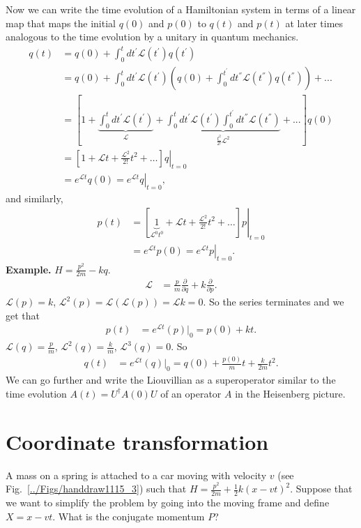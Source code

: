 Now we can write the time evolution of a Hamiltonian system in terms
of a linear map that maps the initial $q(0)$ and $p(0)$ to $q(t)$
and $p(t)$ at later times analogous to the time evolution by a unitary
in quantum mechanics.
\begin{align}
q(t) & =q(0)+\int_{0}^{t}dt^{'}\mathcal{L}\left(t^{'}\right)q\left(t^{'}\right)\\
 & =q(0)+\int_{0}^{t}dt^{'}\mathcal{L}\left(t^{'}\right)\left(q(0)+\int_{0}^{t^{'}}dt^{''}\mathcal{L}\left(t^{''}\right)q\left(t^{''}\right)\right)+...\\
 & =\left[1+\underbrace{\int_{0}^{t}dt^{'}\mathcal{L}\left(t^{'}\right)}_{\mathcal{L}}+\underbrace{\int_{0}^{t}dt^{'}\mathcal{L}\left(t^{'}\right)\int_{0}^{t^{'}}dt^{''}\mathcal{L}\left(t^{''}\right)}_{\frac{t^{2}}{2!}\mathcal{L}^{2}}+...\right]q(0)\\
 &= \left. \left[ 1+ \mathcal{L} t + \frac{\mathcal{L}^2}{2!} t^2 + \ldots \right]q\right|_{t=0}\\
 & =e^{\mathcal{L}t}q(0)= \left. e^{\mathcal{L}t}q\right|_{t=0},
\end{align}
and similarly,
\begin{align}
p(t) &= \left. \left[ \underbrace{1}_{\mathcal{L}^0 t^0}+ \mathcal{L} t + \frac{\mathcal{L}^2}{2!} t^2 + \ldots \right]p\right|_{t=0}\\
& =e^{\mathcal{L}t}p(0)= \left. e^{\mathcal{L}t}p\right|_{t=0}.
\end{align}
\textbf{Example. }$H=\frac{p^{2}}{2m}-kq$.
\begin{align}
\mathcal{L} & =\frac{p}{m}\frac{\partial}{\partial q}+k\frac{\partial}{\partial p}.
\end{align}
$\mathcal{L}(p)=k$, $\mathcal{L}^{2}(p)=\mathcal{L}\left(\mathcal{L}(p)\right)=\mathcal{L}k=0$.
So the series terminates and we get that
\begin{align}
p(t) & =e^{\mathcal{L}t}(p)\Bigr|_{0}=p(0)+kt.
\end{align}
$\mathcal{L}(q)=\frac{p}{m}$, $\mathcal{L}^{2}(q)=\frac{k}{m}$,
$\mathcal{L}^{3}(q)=0$. So
\begin{align}
q(t) & =e^{\mathcal{L}t}(q)\Bigr|_{0}=q(0)+\frac{p(0)}{m}t+\frac{k}{2m}t^{2}.
\end{align}
We can go further and write the Liouvillian as a superoperator similar
to the time evolution $A(t)=U^{\dagger}A(0)U$ of an operator $A$
in the Heisenberg picture.


\section{Coordinate transformation}
A mass on a spring is attached to a car moving with velocity $v$ (see Fig.~\ref{../Figs/handdraw1115_3})
such that $H=\frac{p^{2}}{2m}+\frac{1}{2}k(x-vt)^{2}.$ Suppose that
we want to simplify the problem by going into the moving frame and
define $X=x-vt$. What is the conjugate momentum $P$?

